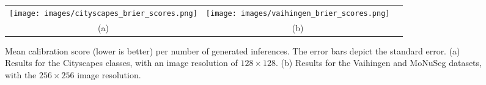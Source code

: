 \documentclass[10pt,twocolumn,letterpaper]{article}
\begin{document}
\begin{figure*}[t]
\centering
\begin{tabular}{@{}c@{~}c@{~}c@{}}
    \texttt{[image: images/cityscapes\_brier\_scores.png]} &  
    \texttt{[image: images/vaihingen\_brier\_scores.png]} 
    \\
    (a) & (b)\\
\end{tabular}

\caption{Mean calibration score (lower is better) per number of generated inferences. The error bars depict the standard error. (a) Results for the Cityscapes classes, with an image resolution of $128\times 128$. (b) Results for the Vaihingen and MoNuSeg datasets, with the $256\times 256$ image resolution.}
\label{fig:datasets_brier_score_for_number_of_generated_instances}
\end{figure*}
\end{document}

